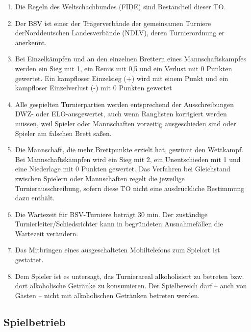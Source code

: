 \documentclass[fontsize=12pt, paper=a4, ngerman]{article}
\begin{document}
\begin{enumerate}
\item Die Regeln des Weltschachbundes (FIDE) sind Bestandteil dieser TO.
\item Der BSV ist einer der Trägerverbände der gemeinsamen Turniere der\linebreak Norddeutschen Landesverbände (NDLV), deren Turnierordnung er anerkennt.
\item Bei Einzelkämpfen und an den einzelnen Brettern eines Mannschafts\-kampfes werden ein Sieg mit 1, ein Remis mit 0,5 und ein Verlust mit 0 Punkten gewertet.
Ein kampfloser Einzelsieg (+) wird mit einem Punkt und ein kampfloser Einzelverlust (-) mit 0 Punkten gewertet
\item Alle gespielten Turnierpartien werden entsprechend der Ausschreibungen DWZ- oder ELO-ausgewertet, auch wenn Ranglisten korrigiert werden müssen,
weil Spieler oder Mannschaften vorzeitig ausgeschieden sind oder Spieler am falschen Brett saßen.
\item Die Mannschaft, die mehr Brettpunkte erzielt hat, gewinnt den Wettkampf. Bei Mannschaftskämpfen wird ein Sieg mit 2, ein Unentschieden mit 1 und eine
Niederlage mit 0 Punkten gewertet. Das Verfahren bei Gleichstand zwischen Spielern oder Mannschaften regelt die jeweilige Turnierausschreibung, sofern diese
TO nicht eine ausdrückliche Bestimmung dazu enthält.
\item Die Wartezeit für BSV-Turniere beträgt 30 min. Der zuständige Turnierleiter/Schiedsrichter kann in begründeten Ausnahmefällen die Wartezeit verändern.
\item Das Mitbringen eines ausgeschalteten Mobiltelefons zum Spielort ist gestattet.
\item Dem Spieler ist es untersagt, das Turnierareal alkoholisiert zu betreten bzw. dort alkoholische Getränke zu konsumieren.
Der Spielbereich darf -- auch von Gästen -- nicht mit alkoholischen Getränken betreten werden.
\end{enumerate}

\subsection{Spielbetrieb}
\end{document}
